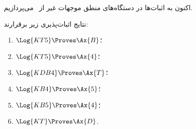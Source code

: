 \documentclass[../../../include/open-logic-section]{subfiles}
\begin{document}


اکنون به اثبات‌ها در دستگاه‌های منطق موجهات غیر از~ می‌پردازیم.

\begin{prop}
نتایج اثبات‌پذیری زیر برقرارند:
  \begin{enumerate}
  \item $\Log{KT5} \Proves \Ax{B}$؛
  \item $\Log{KT5} \Proves \Ax{4}$؛
  \item $\Log{KDB4} \Proves \Ax{T}$؛
  \item $\Log{KB4} \Proves \Ax{5}$؛
  \item $\Log{KB5} \Proves \Ax{4}$؛
  \item {}$\Log{KT} \Proves \Ax{D}$.
  \end{enumerate}
\end{prop}
\end{document}
